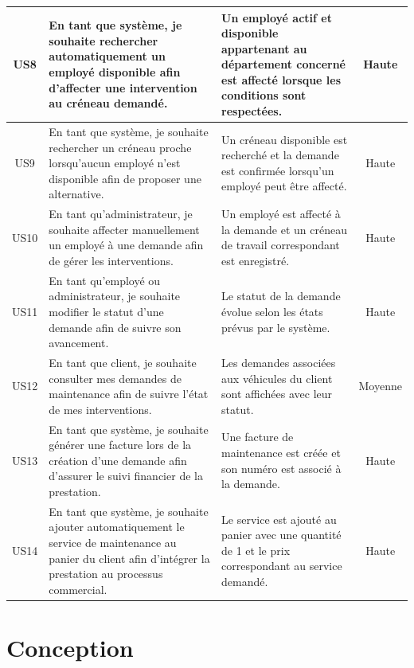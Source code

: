 \begin{longtable}{|c|p{5cm}|p{5cm}|c|}
US8 &
En tant que système, je souhaite rechercher automatiquement un employé disponible afin d'affecter une intervention au créneau demandé. &
Un employé actif et disponible appartenant au département concerné est affecté lorsque les conditions sont respectées. &
Haute \\ \hline

US9 &
En tant que système, je souhaite rechercher un créneau proche lorsqu'aucun employé n'est disponible afin de proposer une alternative. &
Un créneau disponible est recherché et la demande est confirmée lorsqu'un employé peut être affecté. &
Haute \\ \hline

US10 &
En tant qu'administrateur, je souhaite affecter manuellement un employé à une demande afin de gérer les interventions. &
Un employé est affecté à la demande et un créneau de travail correspondant est enregistré. &
Haute \\ \hline

US11 &
En tant qu'employé ou administrateur, je souhaite modifier le statut d'une demande afin de suivre son avancement. &
Le statut de la demande évolue selon les états prévus par le système. &
Haute \\ \hline

US12 &
En tant que client, je souhaite consulter mes demandes de maintenance afin de suivre l'état de mes interventions. &
Les demandes associées aux véhicules du client sont affichées avec leur statut. &
Moyenne \\ \hline

US13 &
En tant que système, je souhaite générer une facture lors de la création d'une demande afin d'assurer le suivi financier de la prestation. &
Une facture de maintenance est créée et son numéro est associé à la demande. &
Haute \\ \hline

US14 &
En tant que système, je souhaite ajouter automatiquement le service de maintenance au panier du client afin d'intégrer la prestation au processus commercial. &
Le service est ajouté au panier avec une quantité de 1 et le prix correspondant au service demandé. &
Haute \\ \hline


\end{longtable}



\section{Conception}

